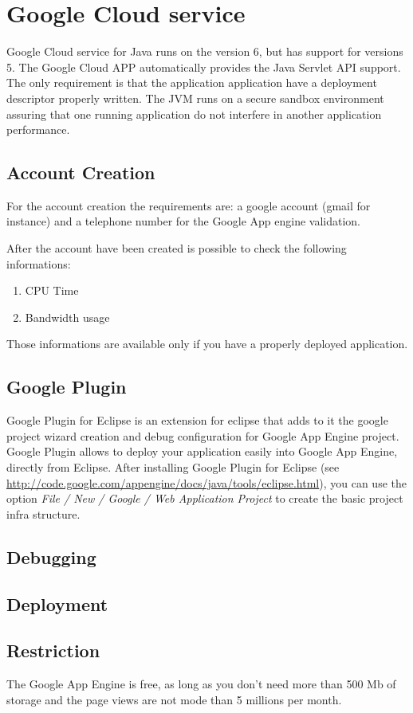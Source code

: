 \documentclass{article}
\begin{document}
\section{Google Cloud service}

Google Cloud service for Java runs on the version 6, but has support for versions 5. 
The Google Cloud APP automatically provides the Java Servlet API support. The only requirement is that the application application have a deployment descriptor properly written. 
The JVM runs on a secure sandbox environment assuring that one running application do not interfere in another application performance.

\subsection{Account Creation}

For the account creation the requirements are: a google account (gmail for instance) and a telephone number for the Google App engine validation.

After the account have been created is possible to check the following informations:
\begin{enumerate}
\item CPU Time
\item Bandwidth usage
\end{enumerate}

Those informations are available only if you have a properly deployed application.

\subsection{Google Plugin}

Google Plugin for Eclipse is an extension for eclipse that adds to it the google project wizard creation and debug configuration for Google App Engine project.
Google Plugin allows to deploy your application easily into Google App Engine, directly from Eclipse.
After installing Google Plugin for Eclipse (see \url{http://code.google.com/appengine/docs/java/tools/eclipse.html}), you can use the option \emph{File / New / Google / Web Application Project} to create the basic project infra structure.

\subsection{Debugging}
\subsection{Deployment}
\subsection{Restriction}
The Google App Engine is free, as long as you don't need more than 500 Mb of storage and the page views are not mode than 5 millions per month.
\end{document}
